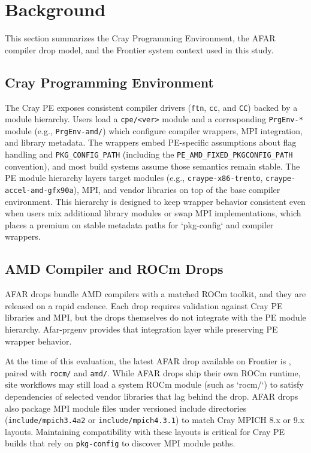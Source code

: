 \section{Background}
\label{sec:background}
This section summarizes the Cray Programming Environment, the AFAR compiler
drop model, and the Frontier system context used in this study.

\subsection{Cray Programming Environment}
\label{sec:cray-pe}
The Cray PE exposes consistent compiler drivers (\texttt{ftn}, \texttt{cc}, and
\texttt{CC}) backed by a module hierarchy. Users load a \texttt{cpe/<ver>}
module and a corresponding \texttt{PrgEnv-*} module (e.g.,
\texttt{PrgEnv-amd/\allowbreak \prgenvversion}) which configure compiler
wrappers, MPI integration, and library metadata. The wrappers embed PE-specific
assumptions about flag handling and \texttt{PKG\_\allowbreak CONFIG\_PATH}
(including the \texttt{PE\_AMD\_\allowbreak FIXED\_\allowbreak PKGCONFIG\_PATH}
convention), and most build systems assume those semantics remain stable.
The PE module hierarchy layers target modules (e.g.,
\texttt{craype-x86-trento}, \texttt{craype-accel-amd-gfx90a}), MPI, and vendor
libraries on top of the base compiler environment. This hierarchy is designed
to keep wrapper behavior consistent even when users mix additional library
modules or swap MPI implementations, which places a premium on stable metadata
paths for `pkg-config` and compiler wrappers.

\subsection{AMD Compiler and ROCm Drops}
\label{sec:amd-drops}
AFAR drops bundle AMD compilers with a matched ROCm toolkit, and they are
released on a rapid cadence. Each drop requires validation against Cray PE
libraries and MPI, but the drops themselves do not integrate with the PE
module hierarchy. Afar-prgenv provides that integration layer while preserving
PE wrapper behavior.

At the time of this evaluation, the latest AFAR drop available on Frontier is
\afarversion, paired with \texttt{rocm/\allowbreak \afarrocm} and
\texttt{amd/\allowbreak \afarrocm}.
While AFAR drops ship their own ROCm runtime, site workflows may still load a
system ROCm module (such as `rocm/\afarrocm`) to satisfy dependencies of
selected vendor libraries that lag behind the drop.
AFAR drops also package MPI module files under versioned include directories
(\texttt{include/mpich3.4a2} or \texttt{include/mpich4.3.1}) to match Cray MPICH
8.x or 9.x layouts. Maintaining compatibility with these layouts is critical
for Cray PE builds that rely on \texttt{pkg-config} to discover MPI module
paths.

